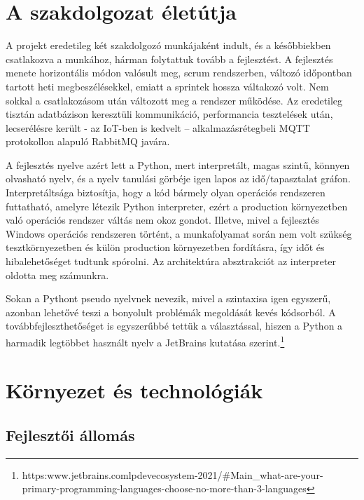 \documentclass[12pt]{report}
\begin{document}
\chapter{A szakdolgozat életútja}


A projekt eredetileg két szakdolgozó munkájaként indult, és a későbbiekben csatlakozva a munkához, hárman folytattuk tovább a fejlesztést. A fejlesztés menete horizontális módon valósult meg, scrum rendszerben, változó időpontban tartott heti megbeszélésekkel, emiatt a sprintek hossza váltakozó volt. Nem sokkal a csatlakozásom után változott meg a rendszer működése. Az eredetileg tisztán adatbázison keresztüli kommunikáció, performancia tesztelések után, lecserélésre került - az IoT-ben is kedvelt – alkalmazásrétegbeli MQTT protokollon alapuló RabbitMQ javára.
\par
A fejlesztés nyelve azért lett a Python, mert interpretált, magas szintű, könnyen olvasható nyelv, és a nyelv tanulási görbéje igen lapos az idő/tapasztalat gráfon.
Interpretáltsága biztosítja, hogy a kód bármely olyan operációs rendszeren futtatható, amelyre létezik Python interpreter, ezért a production környezetben való operációs rendszer váltás nem okoz gondot. Illetve, mivel a fejlesztés Windows operációs rendszeren történt, a munkafolyamat során nem volt szükség tesztkörnyezetben és külön production környezetben fordításra, így időt és hibalehetőséget tudtunk spórolni. Az architektúra absztrakciót az interpreter oldotta meg számunkra.

Sokan a Pythont pseudo nyelvnek nevezik, mivel a szintaxisa igen egyszerű, azonban lehetővé teszi a bonyolult problémák megoldását kevés kódsorból. A továbbfejleszthetőséget is egyszerűbbé tettük a választással, hiszen a Python a harmadik legtöbbet használt nyelv a JetBrains kutatása szerint.\footnote{https:\/\/www.jetbrains.com\/lp\/devecosystem-2021/\#Main\_what-are-your-primary-programming-languages-choose-no-more-than-3-languages}




\chapter{Környezet és technológiák}

\section{Fejlesztői állomás}
\end{document}
